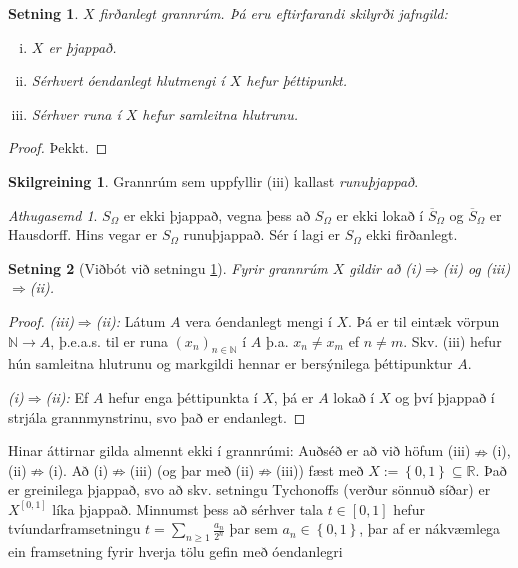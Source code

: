 \documentclass[a4paper,icelandic]{book}
\theoremstyle{definition}
\newtheorem{skilgr}{Skilgreining}[section]
\theoremstyle{plain}
\newtheorem{setn}{Setning}[section]
\theoremstyle{remark}
\newtheorem*{ath}{Athugasemd}
\newcommand{\R}{\mathbb{R}} %
\newcommand{\N}{\mathbb{N}} %
\begin{document}
\begin{setn}\label{setn:thjoppun}
  $X$ firðanlegt grannrúm. Þá eru eftirfarandi skilyrði jafngild:
  \begin{enumerate}[(i)]
  \item $X$ er þjappað.
  \item Sérhvert óendanlegt hlutmengi í $X$ hefur þéttipunkt.
  \item Sérhver runa í $X$ hefur samleitna hlutrunu.
  \end{enumerate}
\end{setn}
\begin{proof}
  Þekkt.
\end{proof}
\begin{skilgr}
  Grannrúm sem uppfyllir (iii) kallast
  \emph{runuþjappað}.
\end{skilgr}
\begin{ath}
  $S_\Omega$ er ekki þjappað, vegna þess að $S_\Omega$ er ekki lokað í
  $\overline S_\Omega$ og $\overline S_\Omega$ er Hausdorff. Hins
  vegar er $S_\Omega$ runuþjappað. Sér í lagi er $S_\Omega$ ekki firðanlegt.
\end{ath}
\begin{setn}[Viðbót við setningu \ref{setn:thjoppun}]
  Fyrir grannrúm $X$ gildir að (i)$\Rightarrow$(ii) og
  (iii)$\Rightarrow$(ii).
\end{setn}
\begin{proof}
  \emph{(iii)$\Rightarrow$(ii):} Látum $A$ vera óendanlegt mengi í
  $X$. Þá er til eintæk vörpun $\N\to A$, þ.e.a.s. til er runa
  $(x_n)_{n\in\N}$ í $A$ þ.a. $x_n\neq x_m$ ef $n\neq m$. Skv. (iii)
  hefur hún samleitna hlutrunu og markgildi hennar er bersýnilega
  þéttipunktur $A$.

  \emph{(i)$\Rightarrow$(ii):} Ef $A$ hefur enga þéttipunkta í $X$, þá
  er $A$ lokað í $X$ og því þjappað í strjála grannmynstrinu, svo það
  er endanlegt.
\end{proof}
Hinar áttirnar gilda almennt ekki í grannrúmi: Auðséð er að við höfum
(iii)$\nRightarrow$(i), (ii)$\nRightarrow$(i). Að
(i)$\nRightarrow$(iii) (og þar með (ii)$\nRightarrow$(iii)) fæst með
$X := \left\{ 0,1 \right\}\subseteq \R$. Það er greinilega þjappað,
svo að skv. setningu Tychonoffs (verður sönnuð síðar) er $X^{\left[ 0,1
\right]}$ líka þjappað. Minnumst þess að sérhver tala $t\in\left[ 0,1
\right]$ hefur tvíundarframsetningu $t = \sum_{n\geq 1}
\frac{a_n}{2^n}$ þar sem $a_n\in\left\{ 0,1 \right\}$, þar af er
nákvæmlega ein framsetning fyrir hverja tölu gefin með óendanlegri
\end{document}
